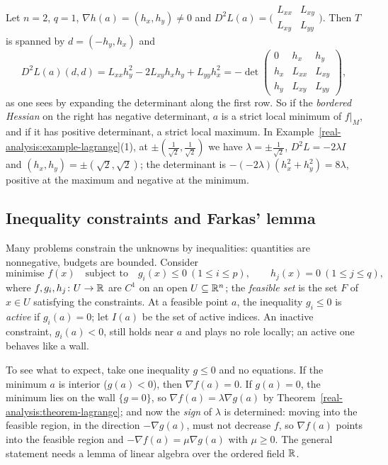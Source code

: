 \begin{example}\label{real-analysis:example-bordered-hessian}
Let $n = 2$, $q = 1$, $\nabla h(a) = (h_x, h_y) \neq 0$ and $D^2L(a) = \bigl(\begin{smallmatrix} L_{xx} & L_{xy}\\ L_{xy} & L_{yy}\end{smallmatrix}\bigr)$. Then $T$ is spanned by $d = (-h_y, h_x)$ and
\[
D^2L(a)(d, d) = L_{xx}h_y^2 - 2L_{xy}h_xh_y + L_{yy}h_x^2 = -\det\begin{pmatrix} 0 & h_x & h_y\\ h_x & L_{xx} & L_{xy}\\ h_y & L_{xy} & L_{yy}\end{pmatrix},
\]
as one sees by expanding the determinant along the first row. So if the \emph{bordered Hessian} on the right has negative determinant, $a$ is a strict local minimum of $f|_M$, and if it has positive
determinant, a strict local maximum. In Example~\ref{real-analysis:example-lagrange}(1), at $\pm(\frac1{\sqrt2}, \frac1{\sqrt2})$ we have $\lambda = \pm\frac1{\sqrt2}$, $D^2L = -2\lambda I$ and
$(h_x, h_y) = \pm(\sqrt2, \sqrt2)$; the determinant is $-(-2\lambda)(h_x^2 + h_y^2) = 8\lambda$, positive at the maximum and negative at the minimum.
\end{example}

\subsection{Inequality constraints and Farkas' lemma}\label{real-analysis:subsection-kkt}

Many problems constrain the unknowns by inequalities: quantities are nonnegative, budgets are bounded. Consider
\begin{equation}\label{real-analysis:equation-nlp}
\text{minimise } f(x) \quad \text{subject to} \quad g_i(x) \leq 0 \ (1 \leq i \leq p), \qquad h_j(x) = 0 \ (1 \leq j \leq q),
\end{equation}
where $f, g_i, h_j \colon U \to \mathbb{R}$ are $C^1$ on an open $U \subseteq \mathbb{R}^n$; the \emph{feasible set} is the set $F$ of $x \in U$ satisfying the constraints. At a feasible point $a$, the inequality $g_i \leq 0$
is \emph{active} if $g_i(a) = 0$; let $I(a)$ be the set of active indices. An inactive constraint, $g_i(a) < 0$, still holds near $a$ and plays no role locally; an active one behaves like a wall.

To see what to expect, take one inequality $g \leq 0$ and no equations. If the minimum $a$ is interior ($g(a) < 0$), then $\nabla f(a) = 0$. If $g(a) = 0$, the minimum lies on the wall $\{g = 0\}$, so
$\nabla f(a) = \lambda\nabla g(a)$ by Theorem~\ref{real-analysis:theorem-lagrange}; and now the \emph{sign} of $\lambda$ is determined: moving into the feasible region, in the direction $-\nabla g(a)$, must not
decrease $f$, so $\nabla f(a)$ points into the feasible region and $-\nabla f(a) = \mu\nabla g(a)$ with $\mu \geq 0$. The general statement needs a lemma of linear algebra over the ordered field $\mathbb{R}$.

